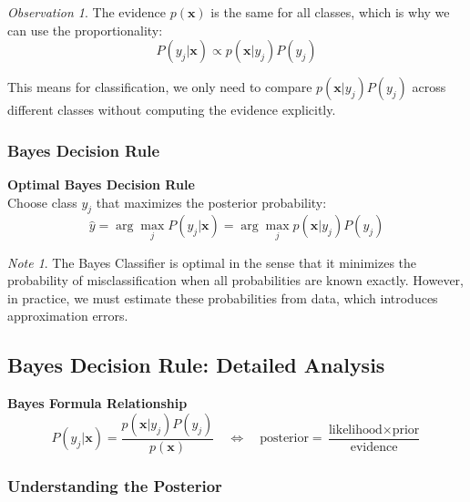 \documentclass[11pt,a4paper]{article}
\theoremstyle{definition}
\theoremstyle{plain}
\theoremstyle{remark}
\newtheorem*{remark}{Note}
\newtheorem*{observation}{Observation}
\begin{document}
\begin{observation}
The evidence $p(\mathbf{x})$ is the same for all classes, which is why we can use the proportionality:
\[
P(y_j|\mathbf{x}) \propto p(\mathbf{x}|y_j)P(y_j)
\]

This means for classification, we only need to compare $p(\mathbf{x}|y_j)P(y_j)$ across different classes without computing the evidence explicitly.
\end{observation}

\subsubsection{Bayes Decision Rule}

\begin{center}
\colorbox{purple!15}{\parbox{0.9\textwidth}{
\centering
\textbf{Optimal Bayes Decision Rule}\\[0.2cm]
Choose class $y_j$ that maximizes the posterior probability:
\[
\hat{y} = \arg\max_{j} P(y_j|\mathbf{x}) = \arg\max_{j} p(\mathbf{x}|y_j)P(y_j)
\]
}}
\end{center}

\begin{remark}
The Bayes Classifier is optimal in the sense that it minimizes the probability of misclassification when all probabilities are known exactly. However, in practice, we must estimate these probabilities from data, which introduces approximation errors.
\end{remark}

\subsection{Bayes Decision Rule: Detailed Analysis}

\begin{center}
\colorbox{yellow!15}{\parbox{0.9\textwidth}{
\centering
\textbf{Bayes Formula Relationship}\\[0.3cm]
\begin{equation*}
P(y_j|\mathbf{x}) = \frac{p(\mathbf{x}|y_j)P(y_j)}{p(\mathbf{x})} \quad \Longleftrightarrow \quad \text{posterior} = \frac{\text{likelihood} \times \text{prior}}{\text{evidence}}
\end{equation*}
}}
\end{center}

\subsubsection{Understanding the Posterior}
\end{document}

